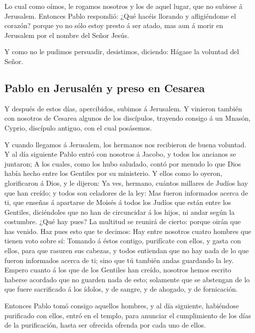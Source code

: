  Lo cual como oímos, le rogamos nosotros y los de aquel
lugar, que no subiese á Jerusalem.  Entonces Pablo
respondió: ¿Qué hacéis llorando y afligiéndome el corazón? porque yo no
sólo estoy presto á ser atado, mas aun á morir en Jerusalem por el
nombre del Señor Jesús.

 Y como no le pudimos persuadir, desistimos, diciendo:
Hágase la voluntad del Señor.

\hypertarget{pablo-en-jerusaluxe9n-y-preso-en-cesarea}{%
\subsection{Pablo en Jerusalén y preso en
Cesarea}\label{pablo-en-jerusaluxe9n-y-preso-en-cesarea}}

 Y después de estos días, apercibidos, subimos á
Jerusalem.  Y vinieron también con nosotros de Cesarea
algunos de los discípulos, trayendo consigo á un Mnasón, Cyprio,
discípulo antiguo, con el cual posásemos.

 Y cuando llegamos á Jerusalem, los hermanos nos
recibieron de buena voluntad.  Y al día siguiente Pablo
entró con nosotros á Jacobo, y todos los ancianos se juntaron;
 A los cuales, como los hubo saludado, contó por menudo
lo que Dios había hecho entre los Gentiles por su ministerio.
 Y ellos como lo oyeron, glorificaron á Dios, y le
dijeron: Ya ves, hermano, cuántos millares de Judíos hay que han creído;
y todos son celadores de la ley:  Mas fueron informados
acerca de ti, que enseñas á apartarse de Moisés á todos los Judíos que
están entre los Gentiles, diciéndoles que no han de circuncidar á los
hijos, ni andar según la costumbre.  ¿Qué hay pues? La
multitud se reunirá de cierto: porque oirán que has venido.
 Haz pues esto que te decimos: Hay entre nosotros cuatro
hombres que tienen voto sobre sí:  Tomando á éstos
contigo, purifícate con ellos, y gasta con ellos, para que rasuren sus
cabezas, y todos entiendan que no hay nada de lo que fueron informados
acerca de ti; sino que tú también andas guardando la ley.
 Empero cuanto á los que de los Gentiles han creído,
nosotros hemos escrito haberse acordado que no guarden nada de esto;
solamente que se abstengan de lo que fuere sacrificado á los ídolos, y
de sangre, y de ahogado, y de fornicación.

 Entonces Pablo tomó consigo aquellos hombres, y al día
siguiente, habiéndose purificado con ellos, entró en el templo, para
anunciar el cumplimiento de los días de la purificación, hasta ser
ofrecida ofrenda por cada uno de ellos.

